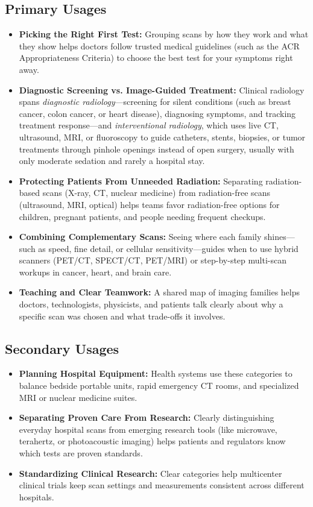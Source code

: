 \subsection{Primary Usages}
\begin{itemize}
  \item \textbf{Picking the Right First Test:} Grouping scans by how they work and what they show helps doctors follow trusted medical guidelines (such as the ACR Appropriateness Criteria) to choose the best test for your symptoms right away.
  \item \textbf{Diagnostic Screening vs. Image-Guided Treatment:} Clinical radiology spans \emph{diagnostic radiology}---screening for silent conditions (such as breast cancer, colon cancer, or heart disease), diagnosing symptoms, and tracking treatment response---and \emph{interventional radiology}, which uses live CT, ultrasound, MRI, or fluoroscopy to guide catheters, stents, biopsies, or tumor treatments through pinhole openings instead of open surgery, usually with only moderate sedation and rarely a hospital stay.
  \item \textbf{Protecting Patients From Unneeded Radiation:} Separating radiation-based scans (X-ray, CT, nuclear medicine) from radiation-free scans (ultrasound, MRI, optical) helps teams favor radiation-free options for children, pregnant patients, and people needing frequent checkups.
  \item \textbf{Combining Complementary Scans:} Seeing where each family shines---such as speed, fine detail, or cellular sensitivity---guides when to use hybrid scanners (PET/CT, SPECT/CT, PET/MRI) or step-by-step multi-scan workups in cancer, heart, and brain care.
  \item \textbf{Teaching and Clear Teamwork:} A shared map of imaging families helps doctors, technologists, physicists, and patients talk clearly about why a specific scan was chosen and what trade-offs it involves.
\end{itemize}

\subsection{Secondary Usages}
\begin{itemize}
  \item \textbf{Planning Hospital Equipment:} Health systems use these categories to balance bedside portable units, rapid emergency CT rooms, and specialized MRI or nuclear medicine suites.
  \item \textbf{Separating Proven Care From Research:} Clearly distinguishing everyday hospital scans from emerging research tools (like microwave, terahertz, or photoacoustic imaging) helps patients and regulators know which tests are proven standards.
  \item \textbf{Standardizing Clinical Research:} Clear categories help multicenter clinical trials keep scan settings and measurements consistent across different hospitals.
\end{itemize}

